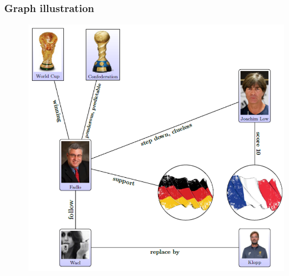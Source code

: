 \documentclass[xcolor=table]{beamer}
\begin{document}
\begin{frame}
\frametitle{Graph illustration}
\begin{figure}[!htb]
   \centering
    \includegraphics[scale=0.4]{img0008.png}
    
\end{figure}

\end{frame}
\end{document}
